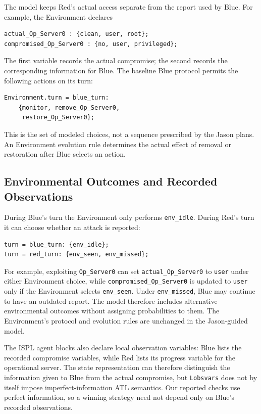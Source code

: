 \documentclass[runningheads]{llncs}
\begin{document}
The model keeps Red's actual access separate from the report used by Blue. For example, the Environment declares

\begin{verbatim}
actual_Op_Server0 : {clean, user, root};
compromised_Op_Server0 : {no, user, privileged};
\end{verbatim}

The first variable records the actual compromise; the second records the corresponding information for Blue. The baseline Blue protocol permits the following actions on its turn:

\begin{verbatim}
Environment.turn = blue_turn:
    {monitor, remove_Op_Server0,
     restore_Op_Server0};
\end{verbatim}

This is the set of modeled choices, not a sequence prescribed by the Jason plans. An Environment evolution rule determines the actual effect of removal or restoration after Blue selects an action.

\subsection{Environmental Outcomes and Recorded Observations}

During Blue's turn the Environment only performs \texttt{env\_idle}. During Red's turn it can choose whether an attack is reported:

\begin{verbatim}
turn = blue_turn: {env_idle};
turn = red_turn: {env_seen, env_missed};
\end{verbatim}

For example, exploiting \texttt{Op\_Server0} can set \texttt{actual\_Op\_Server0} to \texttt{user} under either Environment choice, while \texttt{compromised\_Op\_Server0} is updated to \texttt{user} only if the Environment selects \texttt{env\_seen}. Under \texttt{env\_missed}, Blue may continue to have an outdated report. The model therefore includes alternative environmental outcomes without assigning probabilities to them. The Environment's protocol and evolution rules are unchanged in the Jason-guided model.

The ISPL agent blocks also declare local observation variables: Blue lists the recorded compromise variables, while Red lists its progress variable for the operational server. The state representation can therefore distinguish the information given to Blue from the actual compromise, but \texttt{Lobsvars} does not by itself impose imperfect-information ATL semantics. Our reported checks use perfect information, so a winning strategy need not depend only on Blue's recorded observations.
\end{document}
